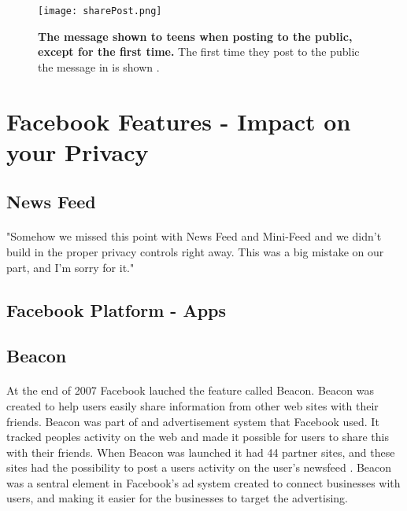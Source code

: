 \begin{figure}[h!]
\centering
\texttt{[image: sharePost.png]}
\caption [The message shown to teens when posting to the public, except for the first time]{\textbf{The message shown to teens when posting to the public, except for the first time.} The first time they post to the public the message in  is shown \cite{defaultTeens}.} 
\label{fig:sharePost}
\end{figure}

\section{Facebook Features - Impact on your Privacy}\label{sec:facebook_features}


\subsection{News Feed}
\paragraph{}
"Somehow we missed this point with News Feed and Mini-Feed and we didn't build in the proper privacy controls right away. This was a big mistake on our part, and I'm sorry for it." \cite{FacebookStoryInceptionToIsp}

\subsection{Facebook Platform - Apps}


\subsection{Beacon}

\paragraph{}
At the end of 2007 Facebook lauched the feature called Beacon. Beacon was created to help users easily share information from other web sites with their friends. Beacon was part of and advertisement system that Facebook used. It tracked peoples activity on the web and made it possible for users to share this with their friends. When Beacon was launched it had 44 partner sites, and these sites had the possibility to post a users activity on the user's newsfeed \cite{BeaconWebsites}. Beacon was a sentral element in Facebook's ad system created to connect businesses with users, and making it easier for the businesses to target the advertising. 

